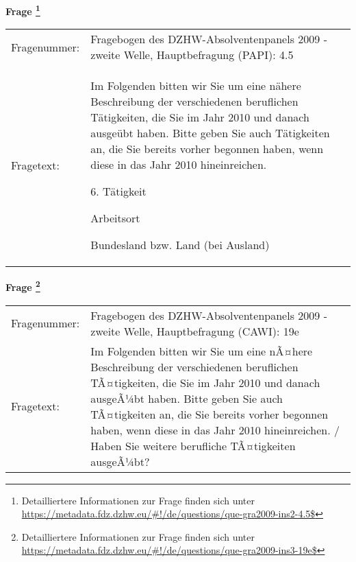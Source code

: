 				\vspace*{0.5cm}
                \noindent\textbf{Frage
	                \footnote{Detailliertere Informationen zur Frage finden sich unter
		              \url{https://metadata.fdz.dzhw.eu/\#!/de/questions/que-gra2009-ins2-4.5$}}}\\
				\begin{tabularx}{\hsize}{@{}lX}
					Fragenummer: &
					  Fragebogen des DZHW-Absolventenpanels 2009 - zweite Welle, Hauptbefragung (PAPI):
					  4.5
 \\
					Fragetext: & Im Folgenden bitten wir Sie um eine nähere Beschreibung der verschiedenen beruflichen Tätigkeiten, die Sie im Jahr 2010 und danach ausgeübt haben. Bitte geben Sie auch Tätigkeiten an, die Sie bereits vorher begonnen haben, wenn diese in das Jahr 2010 hineinreichen.\par  6. Tätigkeit\par  Arbeitsort\par  Bundesland bzw. Land (bei Ausland) \\
				\end{tabularx}
				\vspace*{0.5cm}
                \noindent\textbf{Frage
	                \footnote{Detailliertere Informationen zur Frage finden sich unter
		              \url{https://metadata.fdz.dzhw.eu/\#!/de/questions/que-gra2009-ins3-19e$}}}\\
				\begin{tabularx}{\hsize}{@{}lX}
					Fragenummer: &
					  Fragebogen des DZHW-Absolventenpanels 2009 - zweite Welle, Hauptbefragung (CAWI):
					  19e
 \\
					Fragetext: & Im Folgenden bitten wir Sie um eine nÃ¤here Beschreibung der verschiedenen beruflichen TÃ¤tigkeiten, die Sie im Jahr 2010 und danach ausgeÃ¼bt haben. Bitte geben Sie auch TÃ¤tigkeiten an, die Sie bereits vorher begonnen haben, wenn diese in das Jahr 2010 hineinreichen. / Haben Sie weitere berufliche TÃ¤tigkeiten ausgeÃ¼bt? \\
				\end{tabularx}





